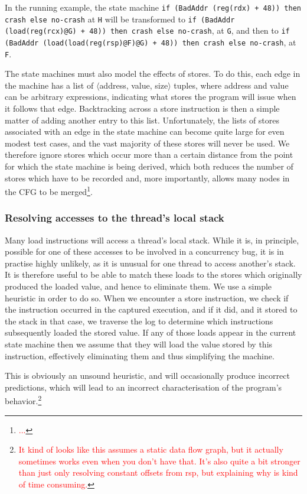 \documentclass[10pt,twocolumn,preprint,natbib,authoryear]{sigplanconf}
\newcommand{\editorial}[1]{\textcolor{red}{\footnote{\textcolor{red}{#1}}}}
\begin{document}
In the running example, the state machine
\verb|if (BadAddr (reg(rdx) + 48)) then crash else no-crash| at
\verb|H| will be transformed to
\verb|if (BadAddr (load(reg(rcx)@G) + 48)) then crash else no-crash|,
at \verb|G|, and then to
\verb|if (BadAddr (load(load(reg(rsp)@F)@G) + 48)) then crash else no-crash|,
at \verb|F|.

The state machines must also model the effects of stores.  To do this,
each edge in the machine has a list of $\langle{}$address, value,
size$\rangle{}$ tuples, where address and value can be arbitrary
expressions, indicating what stores the program will issue when it
follows that edge.  Backtracking across a store instruction is then a
simple matter of adding another entry to this list.  Unfortunately,
the lists of stores associated with an edge in the state machine can
become quite large for even modest test cases, and the vast majority
of these stores will never be used.  We therefore ignore stores which
occur more than a certain distance from the point for which the state
machine is being derived, which both reduces the number of stores
which have to be recorded and, more importantly, allows many nodes in
the CFG to be merged\editorial{...}.

\subsubsection{Resolving accesses to the thread's local stack}
\label{sect:resolvestack}

Many load instructions will access a thread's local stack.  While it
is, in principle, possible for one of these accesses to be involved in
a concurrency bug, it is in practise highly unlikely, as it is unusual
for one thread to access another's stack.  It is therefore useful to
be able to match these loads to the stores which originally produced
the loaded value, and hence to eliminate them.  We use a simple
heuristic in order to do so.  When we encounter a store instruction,
we check if the instruction occurred in the captured execution, and if
it did, and it stored to the stack in that case, we traverse the log
to determine which instructions subsequently loaded the stored value.
If any of those loads appear in the current state machine then we
assume that they will load the value stored by this instruction,
effectively eliminating them and thus simplifying the machine.

This is obviously an unsound heuristic, and will occasionally produce
incorrect predictions, which will lead to an incorrect
characterisation of the program's behavior.\editorial{It kind of looks
  like this assumes a static data flow graph, but it actually
  sometimes works even when you don't have that.  It's also quite a
  bit stronger than just only resolving constant offsets from rsp, but
  explaining why is kind of time consuming.}
\end{document}
